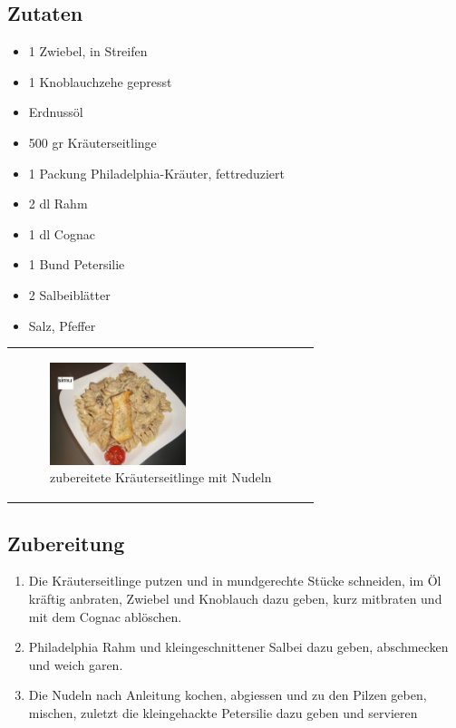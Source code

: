 \documentclass[a4paper,abstracton]{scrreprt}
\begin{document}
\begin{minipage}{0.45\textwidth}

\subsection{Zutaten}
\begin{itemize}
\item 1 Zwiebel, in Streifen
\item 1 Knoblauchzehe gepresst
\item Erdnussöl
\item 500 gr Kräuterseitlinge
\item 1 Packung Philadelphia-Kräuter, fettreduziert
\item 2 dl Rahm
\item 1 dl Cognac
\item 1 Bund Petersilie
\item 2 Salbeiblätter
\item Salz, Pfeffer
\end{itemize}
\end{minipage}%
\begin{minipage}{0.45\textwidth}
\begin{tabular}{p{\textwidth}}

\begin{figure}[H]
\centering
\includegraphics[width=150px]{rezept}
\caption{zubereitete Kräuterseitlinge mit Nudeln\protect\footnotemark}
\label{fig:rezept}
\end{figure}

\end{tabular}
\end{minipage}%

\subsection{Zubereitung}
\begin{enumerate}
\item Die Kräuterseitlinge putzen und in mundgerechte Stücke schneiden, im Öl kräftig anbraten, Zwiebel und Knoblauch dazu geben, kurz mitbraten und mit dem Cognac ablöschen.
\item Philadelphia Rahm und kleingeschnittener Salbei dazu geben, abschmecken und weich garen.
\item Die Nudeln nach Anleitung kochen, abgiessen und zu den Pilzen geben, mischen, zuletzt die kleingehackte Petersilie dazu geben und servieren
\end{enumerate}

\printbibliography[heading=lit]
\end{document}
